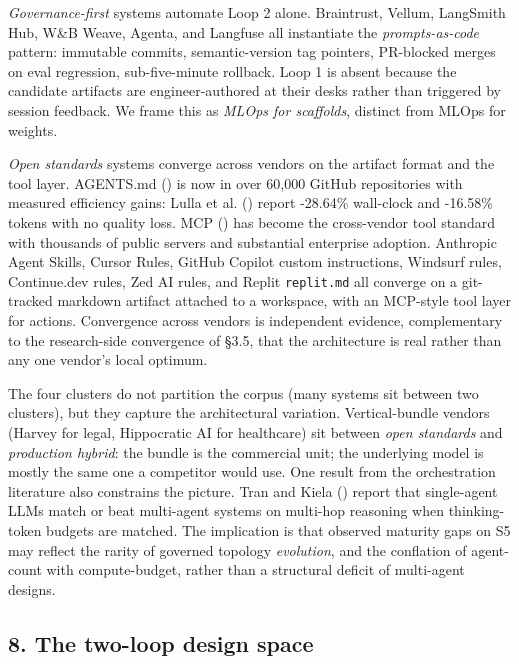 \documentclass[
]{article}
\begin{document}
\emph{Governance-first} systems automate Loop 2 alone. Braintrust,
Vellum, LangSmith Hub, W\&B Weave, Agenta, and Langfuse all instantiate
the \emph{prompts-as-code} pattern: immutable commits, semantic-version
tag pointers, PR-blocked merges on eval regression, sub-five-minute
rollback. Loop 1 is absent because the candidate artifacts are
engineer-authored at their desks rather than triggered by session
feedback. We frame this as \emph{MLOps for scaffolds}, distinct from
MLOps for weights.

\emph{Open standards} systems converge across vendors on the artifact
format and the tool layer. AGENTS.md
() is now in over 60,000
GitHub repositories with measured efficiency gains: {Lulla et al.}
() report -28.64\% wall-clock and
-16.58\% tokens with no quality loss. MCP
() has become the
cross-vendor tool standard with thousands of public servers and
substantial enterprise adoption. Anthropic Agent Skills, Cursor Rules,
GitHub Copilot custom instructions, Windsurf rules, Continue.dev rules,
Zed AI rules, and Replit \texttt{replit.md} all converge on a
git-tracked markdown artifact attached to a workspace, with an MCP-style
tool layer for actions. Convergence across vendors is independent
evidence, complementary to the research-side convergence of §3.5, that
the architecture is real rather than any one vendor's local optimum.

The four clusters do not partition the corpus (many systems sit between
two clusters), but they capture the architectural variation.
Vertical-bundle vendors (Harvey for legal, Hippocratic AI for
healthcare) sit between \emph{open standards} and \emph{production
hybrid}: the bundle is the commercial unit; the underlying model is
mostly the same one a competitor would use. One result from the
orchestration literature also constrains the picture. Tran and Kiela
() report that single-agent LLMs
match or beat multi-agent systems on multi-hop reasoning when
thinking-token budgets are matched. The implication is that observed
maturity gaps on S5 may reflect the rarity of governed topology
\emph{evolution}, and the conflation of agent-count with compute-budget,
rather than a structural deficit of multi-agent designs.

\subsection{8. The two-loop design
space}\label{the-two-loop-design-space}
\end{document}
